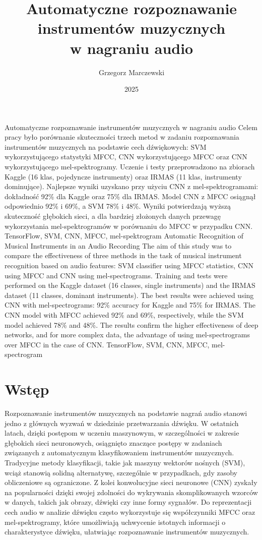 \documentclass{SGGW-thesis}
\title{Automatyczne rozpoznawanie\\instrumentów muzycznych\\w nagraniu audio}
\author{Grzegorz Marczewski}
\date{2025}
\begin{document}
\maketitle
\statementpage
\abstractpage
{Automatyczne rozpoznawanie instrumentów muzycznych w nagraniu audio}
{Celem pracy było porównanie skuteczności trzech metod w zadaniu rozpoznawania instrumentów muzycznych na podstawie cech dźwiękowych: SVM wykorzystującego statystyki MFCC, CNN wykorzystującego MFCC oraz CNN wykorzystującego mel-spektrogramy. Uczenie i testy przeprowadzono na zbiorach Kaggle (16 klas, pojedyncze instrumenty) oraz IRMAS (11 klas, instrumenty dominujące). Najlepsze wyniki uzyskano przy użyciu CNN z mel-spektrogramami: dokładność 92\% dla Kaggle oraz 75\% dla IRMAS. Model CNN z MFCC osiągnął odpowiednio 92\% i 69\%, a SVM 78\% i 48\%. Wyniki potwierdzają wyższą skuteczność głębokich sieci, a dla bardziej złożonych danych przewagę wykorzystania mel-spektrogramów w porównaniu do MFCC w przypadku CNN.}
{TensorFlow, SVM, CNN, MFCC, mel-spektrogram}
{Automatic Recognition of Musical Instruments in an Audio Recording}
{The aim of this study was to compare the effectiveness of three methods in the task of musical instrument recognition based on audio features: SVM classifier using MFCC statistics, CNN using MFCC and CNN using mel-spectrograms. Training and tests were performed on the Kaggle dataset (16 classes, single instruments) and the IRMAS dataset (11 classes, dominant instruments). The best results were achieved using CNN with mel-spectrograms: 92\% accuracy for Kaggle and 75\% for IRMAS. The CNN model with MFCC achieved 92\% and 69\%, respectively, while the SVM model achieved 78\% and 48\%. The results confirm the higher effectiveness of deep networks, and for more complex data, the advantage of using mel-spectrograms over MFCC in the case of CNN.}
{TensorFlow, SVM, CNN, MFCC, mel-spectrogram}




\tableofcontents

\startchapterfromoddpage




\chapter{Wstęp}

Rozpoznawanie instrumentów muzycznych na podstawie nagrań audio stanowi jedno z głównych wyzwań w dziedzinie przetwarzania dźwięku. W ostatnich latach, dzięki postępom w uczeniu maszynowym, w szczególności w zakresie głębokich sieci neuronowych, osiągnięto znaczące postępy w zadaniach związanych z automatycznym klasyfikowaniem instrumentów muzycznych. Tradycyjne metody klasyfikacji, takie jak maszyny wektorów nośnych (SVM), wciąż stanowią solidną alternatywę, szczególnie w przypadkach, gdy zasoby obliczeniowe są ograniczone. Z kolei konwolucyjne sieci neuronowe (CNN) zyskały na popularności dzięki swojej zdolności do wykrywania skomplikowanych wzorców w danych, takich jak obrazy, dźwięki czy inne formy sygnałów. Do reprezentacji cech audio w analizie dźwięku często wykorzystuje się współczynniki MFCC oraz mel-spektrogramy, które umożliwiają uchwycenie istotnych informacji o charakterystyce dźwięku, ułatwiając rozpoznawanie instrumentów muzycznych.
\end{document}

